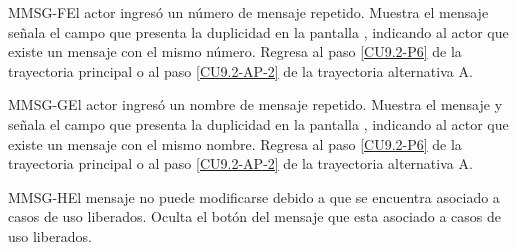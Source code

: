 	\begin{UCtrayectoriaA}{MMSG-F}{El actor ingresó un número de mensaje repetido.}
		\UCpaso[\UCsist] Muestra el mensaje  señala el campo que presenta la duplicidad en la pantalla , indicando al actor que existe un mensaje con el mismo número.
		\UCpaso Regresa al paso \ref{CU9.2-P6} de la trayectoria principal o al paso \ref{CU9.2-AP-2} de la trayectoria alternativa A.
	\end{UCtrayectoriaA}
	
	\begin{UCtrayectoriaA}{MMSG-G}{El actor ingresó un nombre de mensaje repetido.}
		\UCpaso[\UCsist] Muestra el mensaje  y señala el campo que presenta la duplicidad en la pantalla , indicando al actor que existe un mensaje con el mismo nombre.
		\UCpaso Regresa al paso \ref{CU9.2-P6} de la trayectoria principal o al paso \ref{CU9.2-AP-2} de la trayectoria alternativa A.
	\end{UCtrayectoriaA}

	\begin{UCtrayectoriaA}{MMSG-H}{El mensaje no puede modificarse debido a que se encuentra asociado a casos de uso liberados.}
		\UCpaso[\UCsist] Oculta el botón \editar del mensaje que esta asociado a casos de uso liberados.
	\end{UCtrayectoriaA}
